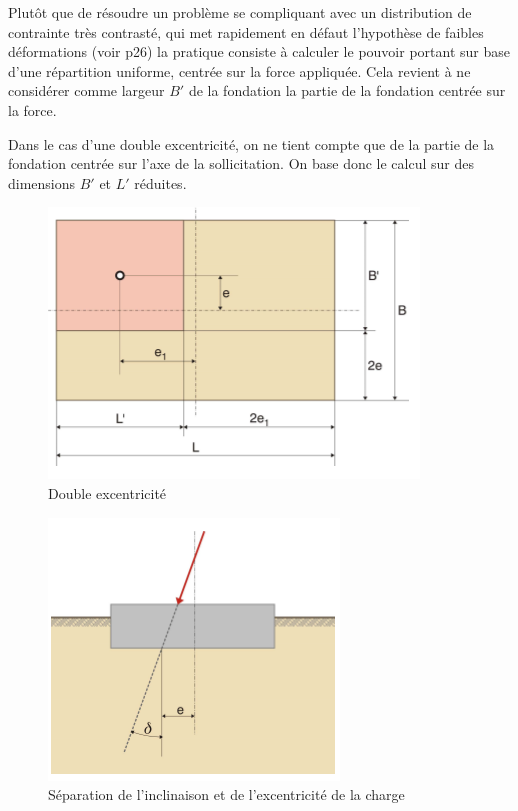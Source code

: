             Plutôt que de résoudre un problème se compliquant avec un distribution de contrainte très contrasté, qui met rapidement en défaut l'hypothèse de faibles déformations (voir p26) la pratique consiste à calculer le pouvoir portant sur base d'une répartition uniforme, centrée sur la force appliquée. Cela revient à ne considérer comme largeur $B'$ de la fondation la partie de la fondation centrée sur la force.
            
            Dans le cas d'une double excentricité, on ne tient compte que de la partie de la fondation centrée sur l'axe de la sollicitation. On base donc le calcul sur des dimensions $B'$ et $L'$ réduites.
            
            \begin{multicols}{2}
            
                \begin{figure}[h!]
                \center
                \includegraphics[scale=0.8]{Holeyman/images/H24.PNG}
                \caption{Double excentricité}
                \end{figure}
            
            \vfill\null\columnbreak
            
                \begin{figure}[h!]
                \includegraphics[scale=0.8]{Holeyman/images/H25.PNG}
                \caption{ Séparation de l’inclinaison et de l’excentricité de la charge}
                \end{figure}
                
            \end{multicols}
            
